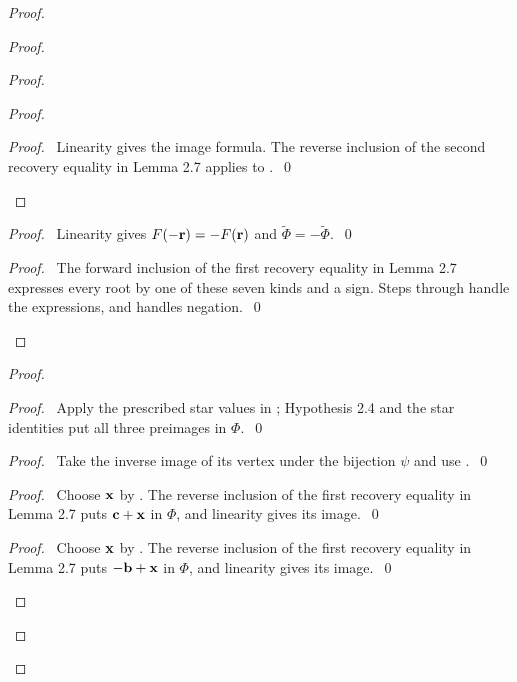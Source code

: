 \begin{proof}
\begin{proof}
\begin{proof}
\begin{proof}
    \qedstep
    \begin{proof}\pf\ Linearity gives the image formula. The reverse inclusion
     of the second recovery equality in Lemma 2.7 applies to
     .~\qed\end{proof}
   \end{proof}
   \begin{proof}\pf\ Linearity gives $F(-{\mathbf r})=-F({\mathbf r})$ and
    $\widetilde\Phi=-\widetilde\Phi$.~\qed\end{proof}
   \qedstep
   \begin{proof}
    \pf\ The forward inclusion of the first recovery equality in Lemma 2.7
    expresses every root by one of these seven kinds and a sign.
    Steps  through 
    handle the expressions, and  handles negation.~\qed
   \end{proof}
  \end{proof}
  \begin{proof}
   \begin{proof}\pf\ Apply the prescribed star values in ;
    Hypothesis 2.4 and the star identities put all three preimages in $\Phi$.~\qed\end{proof}
   \begin{proof}\pf\ Take the inverse image of its vertex under the bijection $\psi$
    and use .~\qed\end{proof}
   \begin{proof}\pf\ Choose ${\mathbf x}$ by .
    The reverse inclusion of the first recovery equality in Lemma 2.7 puts
    ${\mathbf c}+{\mathbf x}$ in $\Phi$, and linearity gives its image.~\qed\end{proof}
   \begin{proof}\pf\ Choose ${\mathbf x}$ by .
    The reverse inclusion of the first recovery equality in Lemma 2.7 puts
    $-{\mathbf b}+{\mathbf x}$ in $\Phi$, and linearity gives its image.~\qed\end{proof}

\end{proof}
\end{proof}
\end{proof}
